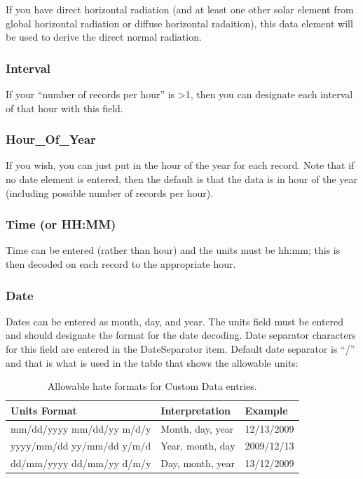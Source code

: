 If you have direct horizontal radiation (and at least one other solar element from global horizontal radiation or diffuse horizontal radaition), this data element will be used to derive the direct normal radiation.

\subsubsection{Interval}\label{interval}

If your ``number of records per hour'' is \textgreater{}1, then you can designate each interval of that hour with this field.

\subsubsection{Hour\_Of\_Year}\label{hourux5fofux5fyear}

If you wish, you can just put in the hour of the year for each record. Note that if no date element is entered, then the default is that the data is in hour of the year (including possible number of records per hour).

\subsubsection{Time (or HH:MM)}\label{time-or-hhmm}

Time can be entered (rather than hour) and the units must be hh:mm; this is then decoded on each record to the appropriate hour.

\subsubsection{Date}\label{date}

Dates can be entered as month, day, and year. The units field must be entered and should designate the format for the date decoding. Date separator characters for this field are entered in the DateSeparator item. Default date separator is ``/'' and that is what is used in the table that shows the allowable units:

\begin{longtable}[c]{@{}lll@{}}
\caption{Allowable hate formats for Custom Data entries. \protect \label{table:allowable-hate-formats-for-custom-data}}\\
\toprule 
Units Format & Interpretation & Example \tabularnewline \midrule
\endhead
mm/dd/yyyy mm/dd/yy m/d/y & Month, day, year & 12/13/2009 \tabularnewline
yyyy/mm/dd yy/mm/dd y/m/d & Year, month, day & 2009/12/13 \tabularnewline
dd/mm/yyyy dd/mm/yy d/m/y & Day, month, year & 13/12/2009 \tabularnewline
\bottomrule
\end{longtable}

